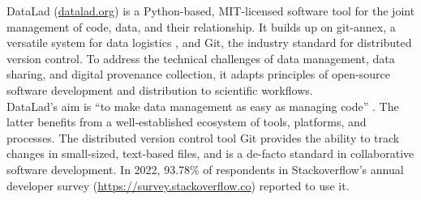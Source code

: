 DataLad (\href{http://datalad.org}{datalad.org}) is a Python-based, MIT-licensed software tool for the joint management of code, data, and their relationship.
It builds up on git-annex, a versatile system for data logistics \citep{hessannex}, and Git, the industry standard for distributed version control.
To address the technical challenges of data management, data sharing, and digital provenance collection, it adapts principles of open-source software development and distribution to scientific workflows. \\
DataLad's aim is ``to make data management as easy as managing code'' \citep{Halchenko2021}.
The latter benefits from a well-established ecosystem of tools, platforms, and processes.
The distributed version control tool Git provides the ability to track changes in small-sized, text-based files, and is a de-facto standard in collaborative software development. In 2022, 93.78\% of respondents in Stackoverflow's annual developer survey (\url{https://survey.stackoverflow.co}) reported to use it.
